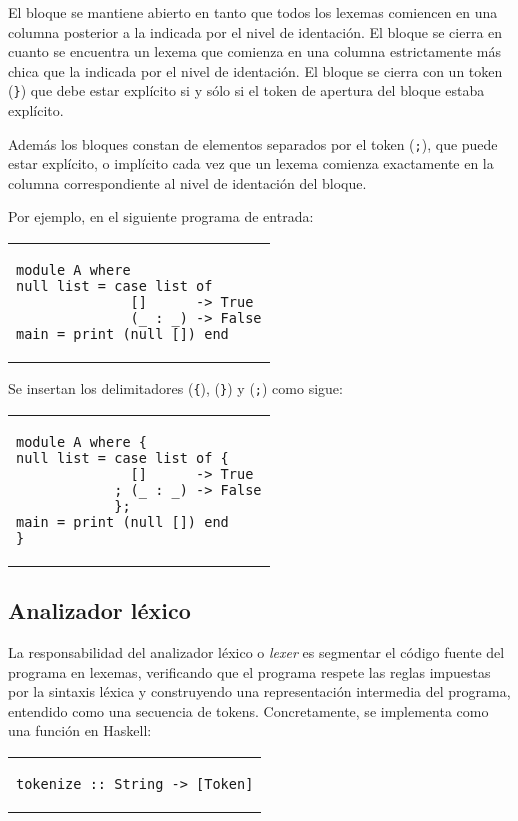 El bloque se mantiene abierto en tanto que
todos los lexemas comiencen en una columna
posterior a la indicada por el nivel de identación.
El bloque se cierra en cuanto se encuentra
un lexema que comienza en una columna estrictamente
más chica que la indicada por el nivel de identación.
El bloque se cierra con un token  (\verb|}|)
que debe estar explícito si y sólo si el token de
apertura del bloque estaba explícito.

Además los bloques constan de elementos separados por
el token  (\verb|;|), que puede estar explícito,
o implícito cada vez que un lexema comienza exactamente
en la columna correspondiente al nivel de identación
del bloque.

Por ejemplo, en el siguiente programa de entrada:
\begin{center}
\begin{tabular}{l}
\begin{lstlisting}
module A where
null list = case list of
              []      -> True
              (_ : _) -> False
main = print (null []) end
\end{lstlisting}
\end{tabular}
\end{center}
Se insertan los delimitadores
 (\verb|{|),
 (\verb|}|) y
 (\verb|;|) como sigue:
\begin{center}
\begin{tabular}{l}
\begin{lstlisting}
module A where {
null list = case list of {
              []      -> True
            ; (_ : _) -> False
            };
main = print (null []) end
}
\end{lstlisting}
\end{tabular}
\end{center}


\subsection{Analizador léxico}

La responsabilidad del analizador léxico o {\em lexer} es
segmentar el código fuente del programa en lexemas,
verificando que el programa respete las reglas impuestas por la sintaxis
léxica
y construyendo una representación intermedia del programa,
entendido como una secuencia de tokens.
Concretamente, se implementa como una función en Haskell:
\begin{center}
\begin{tabular}{l}
\begin{lstlisting}
tokenize :: String -> [Token]
\end{lstlisting}
\end{tabular}
\end{center}


